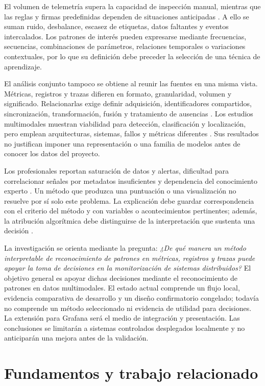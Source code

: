 \documentclass[conference]{IEEEtran}
\begin{document}
El volumen de telemetría supera la capacidad de inspección manual, mientras que las reglas y firmas predefinidas dependen de situaciones anticipadas \cite{ref3,ref20}. A ello se suman ruido, desbalance, escasez de etiquetas, datos faltantes y eventos intercalados. Los patrones de interés pueden expresarse mediante frecuencias, secuencias, combinaciones de parámetros, relaciones temporales o variaciones contextuales, por lo que su definición debe preceder la selección de una técnica de aprendizaje.

El análisis conjunto tampoco se obtiene al reunir las fuentes en una misma vista. Métricas, registros y trazas difieren en formato, granularidad, volumen y significado. Relacionarlas exige definir adquisición, identificadores compartidos, sincronización, transformación, fusión y tratamiento de ausencias \cite{ref11,ref16,ref17,ref18,ref19,ref22}. Los estudios multimodales muestran viabilidad para detección, clasificación y localización, pero emplean arquitecturas, sistemas, fallos y métricas diferentes \cite{ref5,ref6,ref7,ref8}. Sus resultados no justifican imponer una representación o una familia de modelos antes de conocer los datos del proyecto.

Los profesionales reportan saturación de datos y alertas, dificultad para correlacionar señales por metadatos insuficientes y dependencia del conocimiento experto \cite{ref15,ref20}. Un método que produzca una puntuación o una visualización no resuelve por sí solo este problema. La explicación debe guardar correspondencia con el criterio del método y con variables o acontecimientos pertinentes; además, la atribución algorítmica debe distinguirse de la interpretación que sustenta una decisión \cite{ref12,ref13}.

La investigación se orienta mediante la pregunta: \textit{¿De qué manera un método interpretable de reconocimiento de patrones en métricas, registros y trazas puede apoyar la toma de decisiones en la monitorización de sistemas distribuidos?} El objetivo general es apoyar dichas decisiones mediante el reconocimiento de patrones en datos multimodales. El estado actual comprende un flujo local, evidencia comparativa de desarrollo y un diseño confirmatorio congelado; todavía no comprende un método seleccionado ni evidencia de utilidad para decisiones. La extensión para Grafana será el medio de integración y presentación. Las conclusiones se limitarán a sistemas controlados desplegados localmente y no anticiparán una mejora antes de la validación.

\section{Fundamentos y trabajo relacionado}
\end{document}
